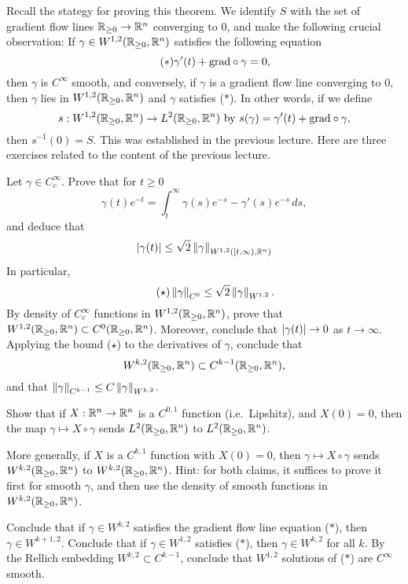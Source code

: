 \documentclass{amsart}
\begin{document}
Recall the stategy for proving this theorem. We identify $S$ with the set of gradient flow lines $\mathbb{R}_{\ge 0}\to \mathbb{R}^{n}$ converging to $0$, and make the following crucial observation: If $\gamma\in W^{1,2}(\mathbb{R}_{\ge 0},\mathbb{R}^{n})$ satisfies the following equation
\begin{equation*}\tag{$\ast$}
  \gamma'(t)+\mathrm{grad}\circ \gamma=0,
\end{equation*}
then $\gamma$ is $C^{\infty}$ smooth, and conversely, if $\gamma$ is a gradient flow line converging to $0$, then $\gamma$ lies in $W^{1,2}(\mathbb{R}_{\ge 0},\mathbb{R}^{n})$ and $\gamma$ satisfies ($\ast$). In other words, if we define
\begin{equation*}
  s:W^{1,2}(\mathbb{R}_{\ge 0},\mathbb{R}^{n})\to L^{2}(\mathbb{R}_{\ge 0},\mathbb{R}^{n}) \text{ by }s(\gamma)=\gamma'(t)+\mathrm{grad}\circ \gamma,
\end{equation*}
then $s^{-1}(0)=S$. This was established in the previous lecture. Here are three exercises related to the content of the previous lecture.
\begin{xca}
  Let $\gamma\in C^{\infty}_{c}$. Prove that for $t\ge 0$
  \begin{equation*}
    \gamma(t)e^{-t}=\int_{t}^{\infty}\gamma(s)e^{-s}-\gamma'(s)e^{-s}\,ds,
  \end{equation*}
  and deduce that
  \begin{equation*}
    \left|\gamma(t)\right|\le \sqrt{2}\left\lVert\gamma\right\rVert_{W^{1,2}([t,\infty),\mathbb{R}^{n})}
  \end{equation*}
  In particular, 
  \begin{equation*}\tag{$\star$}
    \left\lVert\gamma\right\rVert_{C^{0}}\le \sqrt{2}\left\lVert\gamma\right\rVert_{W^{1,2}}.
  \end{equation*}
  By density of $C^{\infty}_{c}$ functions in $W^{1,2}(\mathbb{R}_{\ge 0},\mathbb{R}^{n})$, prove that $W^{1,2}(\mathbb{R}_{\ge 0},\mathbb{R}^{n})\subset C^{0}(\mathbb{R}_{\ge 0},\mathbb{R}^{n})$. Moreover, conclude that $\left|\gamma(t)\right|\to 0$ as $t\to\infty$. Applying the bound ($\star$) to the derivatives of $\gamma$, conclude that $$W^{k,2}(\mathbb{R}_{\ge 0},\mathbb{R}^{n})\subset C^{k-1}(\mathbb{R}_{\ge 0},\mathbb{R}^{n}),$$
  and that $\left\lVert\gamma\right\rVert_{C^{k-1}}\le C\left\lVert\gamma\right\rVert_{W^{k,2}}$.
\end{xca}
\begin{xca}
  Show that if $X:\mathbb{R}^{n}\to \mathbb{R}^{n}$ is a $C^{0,1}$ function (i.e.\ Lipshitz), and $X(0)=0$, then the map $\gamma\mapsto X\circ \gamma$ sends $L^{2}(\mathbb{R}_{\ge 0},\mathbb{R}^{n})$ to $L^{2}(\mathbb{R}_{\ge 0},\mathbb{R}^{n})$. 
  
  More generally, if $X$ is a $C^{k,1}$ function with $X(0)=0$, then $\gamma\mapsto X\circ \gamma$ sends $W^{k,2}(\mathbb{R}_{\ge 0},\mathbb{R}^{n})$ to $W^{k,2}(\mathbb{R}_{\ge 0},\mathbb{R}^{n})$. Hint: for both claims, it suffices to prove it first for smooth $\gamma$, and then use the density of smooth functions in $W^{k,2}(\mathbb{R}_{\ge 0},\mathbb{R}^{n})$.  
\end{xca}
\begin{xca}
  Conclude that if $\gamma\in W^{k,2}$ satisfies the gradient flow line equation ($\ast$), then $\gamma\in W^{k+1,2}$. Conclude that if $\gamma\in W^{1,2}$ satisfies ($\ast$), then $\gamma\in W^{k,2}$ for all $k$. By the Rellich embedding $W^{k,2}\subset C^{k-1}$, conclude that $W^{1,2}$ solutions of ($\ast$) are $C^{\infty}$ smooth. 
\end{xca}
\end{document}

